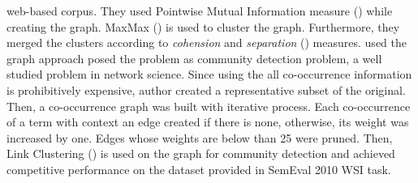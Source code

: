 web-based corpus. They used Pointwise Mutual Information measure (\cite{bouma2009pointwise}) while creating the graph. MaxMax (\cite{hope2013maxmax}) is used to cluster the graph. Furthermore, they merged the clusters according to \emph{cohension} and \emph{separation} (\cite{pang2006introduction}) measures. \cite{jurgens11word} used the graph approach posed the problem as community detection problem, a well studied problem in network science. Since using the all co-occurrence information is prohibitively expensive, author created a representative subset of the original. Then, a co-occurrence graph was built with iterative process. Each co-occurrence of a term with context an edge created if there is none, otherwise, its weight was increased by one. Edges whose weights are below than 25 were pruned. Then, Link Clustering (\cite{ahn10link}) is used on the graph for community detection and achieved competitive performance on the dataset provided in SemEval 2010 WSI task. \\

